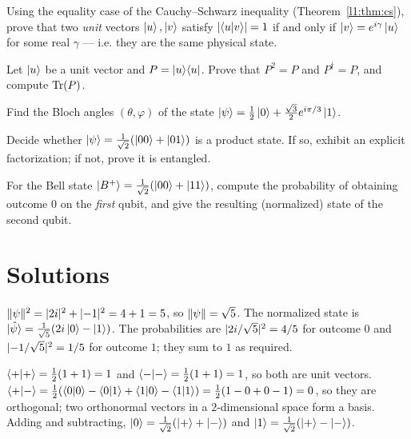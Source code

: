 \begin{exercise}\label{l1:ex:cseq}
Using the equality case of the Cauchy--Schwarz inequality
(Theorem~\ref{l1:thm:cs}), prove that two \emph{unit} vectors $\ket{u},\ket{v}$ satisfy
$\lvert\braket{u|v}\rvert=1$ if and only if $\ket{v}=e^{i\gamma}\ket{u}$ for some real
$\gamma$ --- i.e. they are the same physical state.
\end{exercise}

\begin{exercise}\label{l1:ex:proj}
Let $\ket{u}$ be a unit vector and $P=\ket{u}\!\bra{u}$. Prove that $P^{2}=P$ and
$P^{\dagger}=P$, and compute $\operatorname{Tr}(P)$.
\end{exercise}

\begin{exercise}\label{l1:ex:bloch}
Find the Bloch angles $(\theta,\varphi)$ of the state
$\ket{\psi}=\tfrac{1}{2}\ket{0}+\tfrac{\sqrt3}{2}e^{i\pi/3}\ket{1}$.
\end{exercise}

\begin{exercise}\label{l1:ex:sep}
Decide whether $\ket{\psi}=\tfrac{1}{\sqrt2}(\ket{00}+\ket{01})$ is a product state.
If so, exhibit an explicit factorization; if not, prove it is entangled.
\end{exercise}

\begin{exercise}\label{l1:ex:bellmeas}
For the Bell state $\ket{B^{+}}=\tfrac{1}{\sqrt2}(\ket{00}+\ket{11})$, compute the
probability of obtaining outcome $0$ on the \emph{first} qubit, and give the
resulting (normalized) state of the second qubit.
\end{exercise}

\section*{Solutions}

\begin{solution}
$\lVert\psi\rVert^{2}=\lvert2i\rvert^{2}+\lvert-1\rvert^{2}=4+1=5$, so $\lVert\psi\rVert=\sqrt5$. The
normalized state is $\ket{\hat\psi}=\tfrac{1}{\sqrt5}(2i\ket{0}-\ket{1})$. The
probabilities are $\lvert2i/\sqrt5\rvert^{2}=4/5$ for outcome $0$ and
$\lvert-1/\sqrt5\rvert^{2}=1/5$ for outcome $1$; they sum to $1$ as required.
\end{solution}

\begin{solution}
$\braket{+|+}=\tfrac12(1+1)=1$ and $\braket{-|-}=\tfrac12(1+1)=1$, so both are unit
vectors. $\braket{+|-}=\tfrac12(\braket{0|0}-\braket{0|1}+\braket{1|0}-\braket{1|1})=\tfrac12(1-0+0-1)=0$,
so they are orthogonal; two orthonormal vectors in a $2$-dimensional space form a
basis. Adding and subtracting, $\ket{0}=\tfrac{1}{\sqrt2}(\ket{+}+\ket{-})$ and
$\ket{1}=\tfrac{1}{\sqrt2}(\ket{+}-\ket{-})$.
\end{solution}

